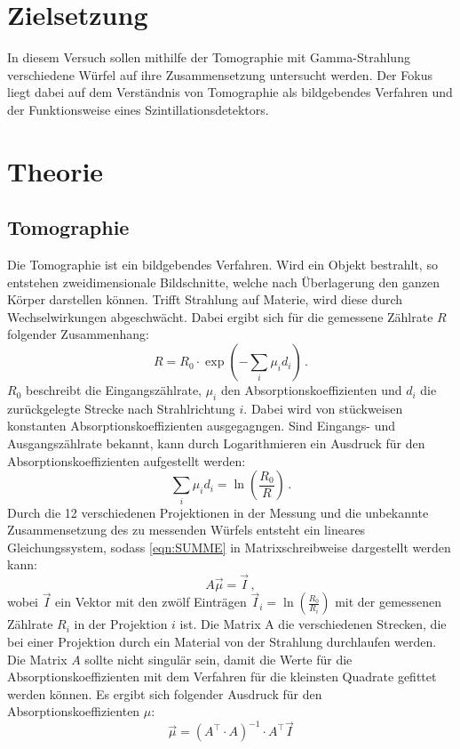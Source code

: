 \section{Zielsetzung}
In diesem Versuch sollen mithilfe der Tomographie mit Gamma-Strahlung verschiedene Würfel auf ihre Zusammensetzung untersucht werden.
Der Fokus liegt dabei auf dem Verständnis von Tomographie als bildgebendes Verfahren und der Funktionsweise eines Szintillationsdetektors.

\section{Theorie}
\label{sec:Theorie}

\subsection{Tomographie}
Die Tomographie ist ein bildgebendes Verfahren.
Wird ein Objekt bestrahlt, so entstehen zweidimensionale Bildschnitte, welche nach Überlagerung den ganzen Körper darstellen können.
Trifft Strahlung auf Materie, wird diese durch Wechselwirkungen abgeschwächt.
Dabei ergibt sich für die gemessene Zählrate $R$ folgender Zusammenhang:
\begin{equation*}
    R = R_0 \cdot \exp{(- \sum_{i} \mu_i d_i)} \, .
\end{equation*}
$R_0$ beschreibt die Eingangszählrate, $\mu_i$ den Absorptionskoeffizienten und $d_i$ die zurückgelegte Strecke nach Strahlrichtung $i$.
Dabei wird von stückweisen konstanten Absorptionskoeffizienten ausgegagngen. 
Sind Eingangs- und Ausgangszählrate bekannt, kann durch Logarithmieren ein Ausdruck für den Absorptionskoeffizienten aufgestellt werden:
\begin{equation}
    \sum_{i} \mu_i d_i = \ln\left(\frac{R_0}{R}\right) \, .
    \label{eqn:SUMME}
\end{equation}
Durch die 12 verschiedenen Projektionen in der Messung und die unbekannte Zusammensetzung des zu messenden Würfels 
entsteht ein lineares Gleichungssystem, sodass \eqref{eqn:SUMME} in Matrixschreibweise dargestellt werden kann:
\begin{equation}
    A \vec{\mu} = \vec{I} \, ,
    \label{eqn:matrix}
\end{equation}
wobei $\vec{I}$ ein Vektor mit den zwölf Einträgen $\vec{I}_i = \ln\left(\frac{R_0}{R_i}\right)$ mit der gemessenen Zählrate $R_i$ in der Projektion $i$ ist.
Die Matrix A die verschiedenen Strecken, die bei einer Projektion durch ein Material von der Strahlung durchlaufen werden.
Die Matrix $A$ sollte nicht singulär sein, damit die Werte für die Absorptionskoeffizienten mit dem Verfahren für die kleinsten Quadrate gefittet werden können.
Es ergibt sich folgender Ausdruck für den Absorptionskoeffizienten $\mu$:
\begin{equation*}
    \vec{\mu} = \left( A^\top \cdot A \right)^{-1} \cdot A^\top \vec{I}
\end{equation*}

